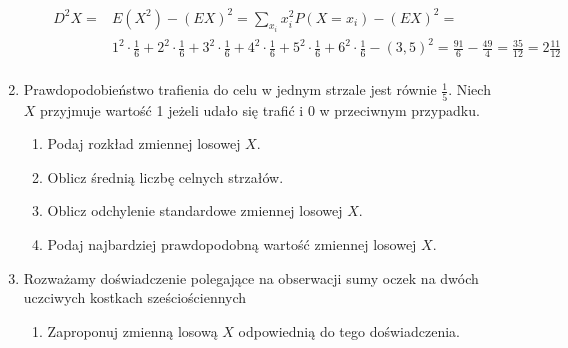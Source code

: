 \documentclass[twoside]{mwart}
\newcommand{\ans}[1]{}
\newenvironment{ansenv}{\comment}{\endcomment}
\newenvironment{ansenv}{\paragraph{Odpowiedź:}}{}
\newcommand{\ans}[1]{\begin{ansenv}#1\end{ansenv}}
\begin{document}
\begin{enumerate}
\begin{enumerate}
{\begin{enumerate}
\begin{align*}
			D^2X = & E(X^2)-(EX)^2 = \sum_{x_i} x_i^2P(X=x_i) - (EX)^2 = \\
			& 1^2\cdot\frac{1}{6} + 2^2\cdot\frac{1}{6} + 3^2\cdot\frac{1}{6} + 4^2\cdot\frac{1}{6} + 5^2\cdot\frac{1}{6} + 6^2\cdot\frac{1}{6} - (3,5)^2 = \frac{91}{6} - \frac{49}{4} = \frac{35}{12} = 2\frac{11}{12} \\
		\end{align*}
	\end{enumerate}
}
\end{enumerate}
\item Prawdopodobieństwo trafienia do celu w jednym strzale jest równie $\frac{1}{5}$. Niech $X$ przyjmuje wartość 1 jeżeli udało się trafić i 0 w przeciwnym przypadku.
\begin{enumerate}
\item Podaj rozkład zmiennej losowej $X$. \ans{$P(X=1)=p\quad P(X=0)=1-p \qquad p=\frac{1}{5}$}
\item Oblicz średnią liczbę celnych strzałów. \ans{$EX=1\cdot p+0\cdot (1-p)=p=\frac{1}{5}$}
\item Oblicz odchylenie standardowe zmiennej losowej $X$. \ans{$DX= \sqrt{D^2X} = \sqrt{E(X^2)-(EX)^2} = \sqrt{1^2\cdot p - p^2} = \sqrt{p(1-p)}=\sqrt{\frac{4}{25}} = \frac{2}{5}$}
\item Podaj najbardziej prawdopodobną wartość zmiennej losowej $X$. \ans{$0$, bo $P(X=0)>P(X=1)$, a mamy do wyboru tylko $0$ i $1$}
\end{enumerate}
\item Rozważamy doświadczenie polegające na obserwacji sumy oczek na dwóch uczciwych kostkach sześciościennych
\begin{enumerate}
\item Zaproponuj zmienną losową $X$ odpowiednią do tego doświadczenia. 
\ans{
	Niech pojedyncze zdarzenie elementarne to para uporządkowana: (wynik na 1. kostce, wynik na 2. kostce), gdzie wyniki są kodowane przez wyrzuconą liczbę oczek 1, 2, \ldots, 6. Wtedy przestrzeń zdarzeń elementarnych wygląda następująco:
	\[ \Omega = \{1, 2, \ldots, 6\}\times \{1, 2, \ldots, 6\} = \{ (1,1), (1,2), \ldots, (1,6), (2, 1), (2, 2), \ldots, (6, 6)\} \]
	
	Wtedy łatwo zdefiniować zmienną:
	\[ X((i, j)) = i+j \qquad \forall (i,j)\in \Omega \]
	
}
\end{enumerate}
\end{enumerate}
\end{document}
